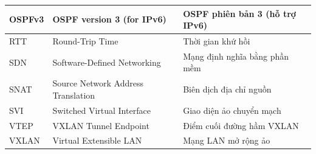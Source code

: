 \begin{center}
\begin{longtable}{|p{2.5cm}|p{6cm}|p{6cm}|}
    \hline
    OSPFv3 & OSPF version 3 (for IPv6) & OSPF phiên bản 3 (hỗ trợ IPv6) \\
    \hline
    RTT & Round-Trip Time & Thời gian khứ hồi \\
    \hline
    SDN & Software-Defined Networking & Mạng định nghĩa bằng phần mềm \\
    \hline
    SNAT & Source Network Address Translation & Biên dịch địa chỉ nguồn \\
    \hline
    SVI & Switched Virtual Interface & Giao diện ảo chuyển mạch \\
    \hline
    VTEP & VXLAN Tunnel Endpoint & Điểm cuối đường hầm VXLAN \\
    \hline
    VXLAN & Virtual Extensible LAN & Mạng LAN mở rộng ảo \\
    \hline

\end{longtable}
\end{center}
